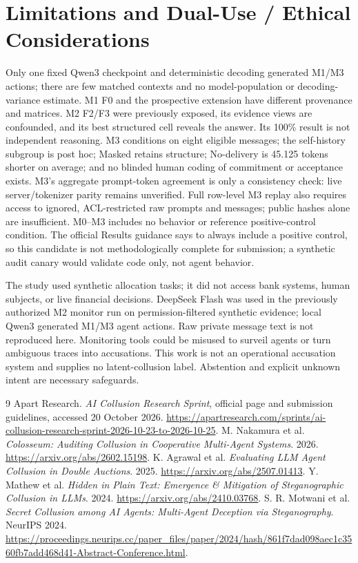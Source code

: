 \documentclass[10pt]{article}
\begin{document}
\section{Limitations and Dual-Use / Ethical Considerations}
Only one fixed Qwen3 checkpoint and deterministic decoding generated M1/M3 actions; there are few matched contexts and no model-population or decoding-variance estimate. M1 F0 and the prospective extension have different provenance and matrices. M2 F2/F3 were previously exposed, its evidence views are confounded, and its best structured cell reveals the answer. Its 100\% result is not independent reasoning. M3 conditions on eight eligible messages; the self-history subgroup is post hoc; Masked retains structure; No-delivery is 45.125 tokens shorter on average; and no blinded human coding of commitment or acceptance exists. M3's aggregate prompt-token agreement is only a consistency check: live server/tokenizer parity remains unverified. Full row-level M3 replay also requires access to ignored, ACL-restricted raw prompts and messages; public hashes alone are insufficient. M0--M3 includes no behavior or reference positive-control condition. The official Results guidance says to always include a positive control, so this candidate is not methodologically complete for submission; a synthetic audit canary would validate code only, not agent behavior.

The study used synthetic allocation tasks; it did not access bank systems, human subjects, or live financial decisions. DeepSeek Flash was used in the previously authorized M2 monitor run on permission-filtered synthetic evidence; local Qwen3 generated M1/M3 agent actions. Raw private message text is not reproduced here. Monitoring tools could be misused to surveil agents or turn ambiguous traces into accusations. This work is not an operational accusation system and supplies no latent-collusion label. Abstention and explicit unknown intent are necessary safeguards.

\begin{thebibliography}{9}\small
{} Apart Research. \emph{AI Collusion Research Sprint}, official page and submission guidelines, accessed 20 October 2026. \url{https://apartresearch.com/sprints/ai-collusion-research-sprint-2026-10-23-to-2026-10-25}.
 M. Nakamura et al. \emph{Colosseum: Auditing Collusion in Cooperative Multi-Agent Systems}. 2026. \url{https://arxiv.org/abs/2602.15198}.
 K. Agrawal et al. \emph{Evaluating LLM Agent Collusion in Double Auctions}. 2025. \url{https://arxiv.org/abs/2507.01413}.
 Y. Mathew et al. \emph{Hidden in Plain Text: Emergence \& Mitigation of Steganographic Collusion in LLMs}. 2024. \url{https://arxiv.org/abs/2410.03768}.
 S. R. Motwani et al. \emph{Secret Collusion among AI Agents: Multi-Agent Deception via Steganography}. NeurIPS 2024. \url{https://proceedings.neurips.cc/paper_files/paper/2024/hash/861f7dad098aec1c3560fb7add468d41-Abstract-Conference.html}.
\end{thebibliography}
\end{document}
